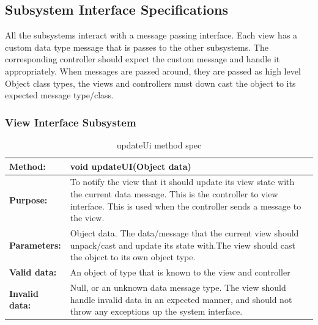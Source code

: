 \documentclass[12pt]{article}
\begin{document}
\subsection{Subsystem Interface Specifications}
All the subsystems interact with a message passing interface. Each view has a custom data type message that is passes to the other subsystems. The corresponding controller should expect the custom message and handle it appropriately. When messages are passed around, they are passed as high level Object class types, the views and controllers must down cast the object to its expected message type/class.


\subsubsection{View Interface Subsystem}

\begin{table}[H]
  \caption{updateUi method spec}
  \begin{center}
    \begin{tabular}{|l|p{10cm}|}

      \hline
      \bf Method: & void updateUI(Object data)\\
		\hline
      \bf Purpose: & To notify the view that it should update its view state with the current data message.
This is the controller to view interface. This is used when the controller sends a message to the view.\\
\hline
      \bf Parameters: & Object data. The data/message that the current view should unpack/cast and update its state with.The view should cast the object to its own object type.\\
		\hline
      \bf Valid data: &  An object of type that is known to the view and controller\\
      \hline
      \bf Invalid data: &  Null, or an unknown data message type. The view should handle invalid data in an expected manner, and should not throw any exceptions up the system interface.\\
      \hline

    \end{tabular}
  \end{center}
\end{table}
\end{document}
